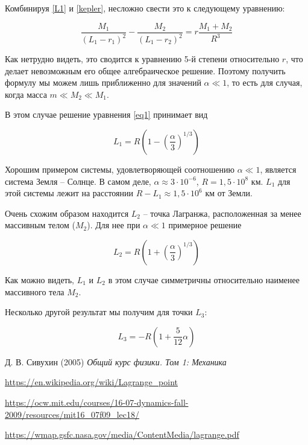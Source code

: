 \documentclass[12pt]{article}
\begin{document}
    \par Комбинируя \ref{L1} и \ref{kepler}, несложно свести это к
    следующему уравнению:

    \begin{equation}
        \frac{M_1}{(L_1 - r_1)^2} - \frac{M_2}{(L_1 - r_2)^2} =
        r\frac{M_1 + M_2}{R^3}
        \label{eq1}
    \end{equation}

    Как нетрудно видеть, это сводится к уравнению 5-й степени относительно $r$,
    что делает невозможным его общее алгебраическое решение. Поэтому получить
    формулу мы можем лишь приближенно для значений $\alpha \ll 1$, то есть для
    случая, когда масса $m \ll M_2 \ll M_1$.
    \par В этом случае решение уравнения \ref{eq1} принимает вид

    \begin{equation}
        L_1 = R\left(1 - \left(\frac{\alpha}{3}\right)^{1/3}\right)
    \end{equation}

    \par Хорошим примером системы, удовлетворяющей соотношению $\alpha \ll 1$,
    является система Земля -- Солнце. В самом деле,
    $\alpha \approx 3 \cdot 10^{-6}$, $R = 1{,}5 \cdot 10^8$ км.
    $L_1$ для этой системы лежит на расстоянии $R - L_1 \approx 1{,}5 \cdot 10^6$
    км от Земли.

    \par Очень схожим образом находится $L_2$ -- точка Лагранжа, расположенная
    за менее массивным телом ($M_2$). Для нее при $\alpha \ll 1$ примерное
    решение

    \begin{equation}
        L_2 = R\left(1 + \left(\frac{\alpha}{3}\right)^{1/3}\right)
    \end{equation}

    \par Как можно видеть, $L_1$ и $L_2$ в этом случае симметричны относительно
    наименее массивного тела $M_2$.

    Несколько другой результат мы получим для точки $L_3$:

    \begin{equation}
        L_3 = -R\left(1 + \frac{5}{12}\alpha\right)
    \end{equation}

    \begin{thebibliography}{10}
        Д. В. Сивухин (2005) \emph{Общий курс физики. Том 1: Механика}
        
        \url{https://en.wikipedia.org/wiki/Lagrange_point}

        \url{https://ocw.mit.edu/courses/16-07-dynamics-fall-2009/resources/mit16_07f09_lec18/}

        \url{https://wmap.gsfc.nasa.gov/media/ContentMedia/lagrange.pdf}
    \end{thebibliography}
\end{document}
